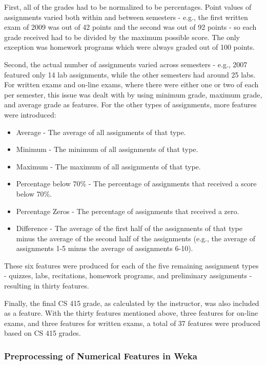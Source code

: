 \documentclass[letterpaper,11pt]{article}
\begin{document}
First, all of the grades had to be normalized to be percentages.  Point values of assignments varied both within and between semesters - e.g., the first written exam of 2009 was out of 42 points and the second was out of 92 points - so each grade received had to be divided by the maximum possible score.  The only exception was homework programs which were always graded out of 100 points.

Second, the actual number of assignments varied across semesters - e.g., 2007 featured only 14 lab assignments, while the other semesters had around 25 labs.  For written exams and on-line exams, where there were either one or two of each per semester, this issue was dealt with by using minimum grade, maximum grade, and average grade as features.  For the other types of assignments, more features were introduced:

\begin{itemize}
\item Average - The average of all assignments of that type.
\item Minimum - The minimum of all assignments of that type.
\item Maximum - The maximum of all assignments of that type.
\item Percentage below 70\% - The percentage of assignments that received a score below 70\%.
\item Percentage Zeros - The percentage of assignments that received a zero.
\item Difference - The average of the first half of the assignments of that type minus the average of the second half of the assignments (e.g., the average of assignments 1-5 minus the average of assignments 6-10).
\end{itemize}

These six features were produced for each of the five remaining assignment types - quizzes, labs, recitations, homework programs, and preliminary assignments - resulting in thirty features.

Finally, the final CS 415 grade, as calculated by the instructor, was also included as a feature.  With the thirty features mentioned above, three features for on-line exams, and three features for written exams, a total of 37 features were produced based on CS 415 grades.

\subsubsection{Preprocessing of Numerical Features in Weka}
\end{document}

